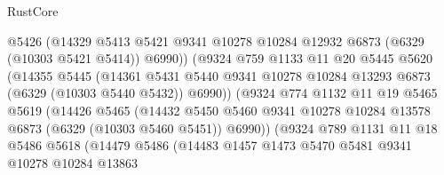 \begin{lexlean}{RustCore}
\begin{coremodule}
                            @5426
                            (@14329
                              @5413
                              @5421
                              @9341
                              @10278
                              @10284
                              @12932
                              @6873
                              (@6329 (@10303 @5421 @5414))
                              @6990))
                          (@9324
                            @759
                            @1133
                            @11
                            @20
                            @5445
                            @5620
                            (@14355
                              @5445
                              (@14361
                                @5431
                                @5440
                                @9341
                                @10278
                                @10284
                                @13293
                                @6873
                                (@6329 (@10303 @5440 @5432))
                                @6990))
                            (@9324
                              @774
                              @1132
                              @11
                              @19
                              @5465
                              @5619
                              (@14426
                                @5465
                                (@14432
                                  @5450
                                  @5460
                                  @9341
                                  @10278
                                  @10284
                                  @13578
                                  @6873
                                  (@6329 (@10303 @5460 @5451))
                                  @6990))
                              (@9324
                                @789
                                @1131
                                @11
                                @18
                                @5486
                                @5618
                                (@14479
                                  @5486
                                  (@14483
                                    @1457
                                    @1473
                                    @5470
                                    @5481
                                    @9341
                                    @10278
                                    @10284
                                    @13863

\end{coremodule}
\end{lexlean}
